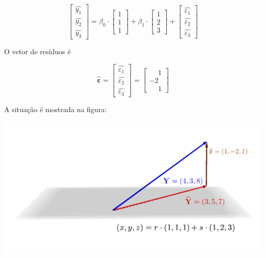 \documentclass[
  letterpaper,
  DIV=11,
  numbers=noendperiod]{scrreprt}
\begin{document}
\begin{enumerate}
  \[
   \begin{bmatrix}
     \widehat{y_1} \\ \widehat{y_2} \\ \widehat{y_3}
   \end{bmatrix}
   =
   \beta_0 \cdot 
   \begin{bmatrix}
     1 \\ 1 \\ 1
   \end{bmatrix}
   + 
   \beta_1 \cdot
   \begin{bmatrix}
     1 \\ 2 \\ 3
   \end{bmatrix}
   +
   \begin{bmatrix}
     \widehat{\varepsilon_1} \\ 
     \widehat{\varepsilon_2} \\ 
     \widehat{\varepsilon_3}
   \end{bmatrix}
  \]

  O vetor de resíduos é

  \[
  \mathbf{\widehat{\varepsilon}} 
  = 
   \begin{bmatrix}
     \widehat{\varepsilon_1} \\ 
     \widehat{\varepsilon_2} \\ 
     \widehat{\varepsilon_3}
   \end{bmatrix}
   = 
   \begin{bmatrix}
      \phantom{-}1 \\ -2 \\ \phantom{-}1
   \end{bmatrix}
  \]
\end{enumerate}

A situação é mostrada na figura:

\includegraphics{images/regressao-visao-geometrica.png}
\end{document}
